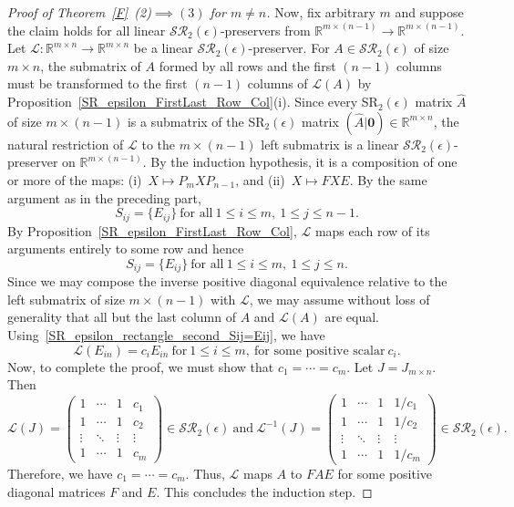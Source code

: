 \documentclass[11pt,reqno]{amsart}
\theoremstyle{plain}
\theoremstyle{definition}
\numberwithin{equation}{section}
\begin{document}
\begin{proof}[Proof of Theorem~\ref{F}~(2)$\implies(3)$ for $m\neq n$]
	Now, fix arbitrary $m$ and suppose the claim holds for all linear $\mathcal{SR}_2(\epsilon)$-preservers from $\mathbb{R}^{m\times(n-1)}\to\mathbb{R}^{m\times(n-1)}$. Let $\mathcal{L}:\mathbb{R}^{m\times n}\to\mathbb{R}^{m\times n}$ be a linear $\mathcal{SR}_2(\epsilon)$-preserver. For $A\in\mathcal{SR}_2(\epsilon)$ of size $m\times n$, the submatrix of $A$ formed by all rows and the first $(n-1)$ columns must be transformed to the first $(n-1)$ columns of $\mathcal{L}(A)$ by Proposition~\ref{SR_epsilon_FirstLast_Row_Col}(i). Since every SR$_2(\epsilon)$ matrix $\widehat{A}$ of size $m\times(n-1)$ is a submatrix of the SR$_2(\epsilon)$ matrix $(\widehat{A}|\mathbf{0})\in\mathbb{R}^{m\times n}$, the natural restriction of $\mathcal{L}$ to the $m\times(n-1)$ left submatrix is a linear $\mathcal{SR}_2(\epsilon)$-preserver on $\mathbb{R}^{m\times(n-1)}$. By the induction hypothesis, it is a composition of one or more of the maps:
	(i)~$X\mapsto P_mXP_{n-1}$, and (ii)~$X\mapsto FXE$. By the same argument as in the preceding part,
	\[S_{ij}=\{E_{ij}\} ~\text{for all}~ 1\leq i\leq m,~ 1\leq j\leq n-1.\] 
	By Proposition~\ref{SR_epsilon_FirstLast_Row_Col}, $\mathcal{L}$ maps each row of its arguments entirely to some row and hence
	\begin{equation}\label{SR_epsilon_rectangle_second_Sij=Eij}
		S_{ij}=\{E_{ij}\} ~\text{for all}~ 1\leq i\leq m,~ 1\leq j\leq n.
	\end{equation} 
	Since we may compose the inverse positive diagonal equivalence relative to the left submatrix of size $m\times(n-1)$ with $\mathcal{L}$, we may assume without loss of generality that all but the last column of $A$ and $\mathcal{L}(A)$ are equal. Using~\eqref{SR_epsilon_rectangle_second_Sij=Eij}, we have
	\[\mathcal{L}(E_{in})=c_iE_{in}~\text{for}~ 1\leq i\leq m, ~\text{for some positive scalar} ~c_i.\]
	Now, to complete the proof, we must show that $c_1=\cdots=c_{m}.$ Let $J=J_{m\times n}$. Then
	\[\mathcal{L}(J)=\begin{pmatrix}
		1 & \cdots & 1 & c_1 \\
		1 & \cdots & 1 & c_2 \\
		\vdots & \ddots & \vdots & \vdots \\
		1 &  \cdots & 1 & c_{m} 
	\end{pmatrix}\in \mathcal{SR}_2(\epsilon) ~\text{and}~ \mathcal{L}^{-1}(J)=\begin{pmatrix}
		1 & \cdots & 1 & 1/c_1 \\
		1 & \cdots & 1 & 1/c_2 \\
		\vdots & \ddots & \vdots & \vdots \\
		1 & \cdots & 1 & 1/c_m 
	\end{pmatrix}\in \mathcal{SR}_2(\epsilon). \]
	Therefore, we have $c_1=\cdots=c_{m}$. Thus, $\mathcal{L}$ maps $A$ to $FAE$ for some positive diagonal matrices $F$ and $E$. This concludes the induction step.
\end{proof}
\end{document}
